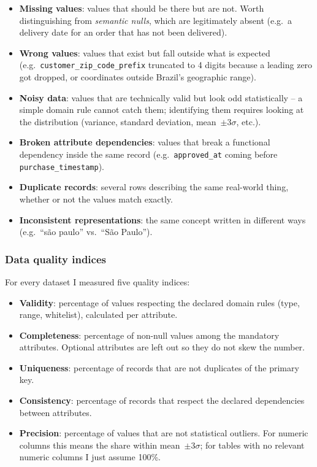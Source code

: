 \documentclass[12pt,a4paper]{article}
\begin{document}
\begin{itemize}
\sloppy
  \item \textbf{Missing values}: values that should be there but are not. Worth
        distinguishing from \textit{semantic nulls}, which are legitimately absent
        (e.g.\ a delivery date for an order that has not been delivered).
  \item \textbf{Wrong values}: values that exist but fall outside what is expected
        (e.g.\ \texttt{customer\_zip\_code\_prefix} truncated to 4 digits because a
        leading zero got dropped, or coordinates outside Brazil's geographic range).
  \item \textbf{Noisy data}: values that are technically valid but look odd
        statistically -- a simple domain rule cannot catch them; identifying them
        requires looking at the distribution (variance, standard deviation,
        mean~$\pm 3\sigma$, etc.).
  \item \textbf{Broken attribute dependencies}: values that break a functional
        dependency inside the same record (e.g.\ \texttt{approved\_at} coming before
        \texttt{purchase\_timestamp}).
  \item \textbf{Duplicate records}: several rows describing the same real-world
        thing, whether or not the values match exactly.
  \item \textbf{Inconsistent representations}: the same concept written in different
        ways (e.g.\ ``são paulo'' vs.\ ``São Paulo'').
\end{itemize}

\subsubsection*{Data quality indices}

For every dataset I measured five quality indices:

\begin{itemize}
  \item \textbf{Validity}: percentage of values respecting the declared domain rules
        (type, range, whitelist), calculated per attribute.
  \item \textbf{Completeness}: percentage of non-null values among the mandatory
        attributes. Optional attributes are left out so they do not skew the number.
  \item \textbf{Uniqueness}: percentage of records that are not duplicates of the
        primary key.
  \item \textbf{Consistency}: percentage of records that respect the declared
        dependencies between attributes.
  \item \textbf{Precision}: percentage of values that are not statistical outliers.
        For numeric columns this means the share within mean~$\pm 3\sigma$; for
        tables with no relevant numeric columns I just assume 100\%.
\end{itemize}
\end{document}
